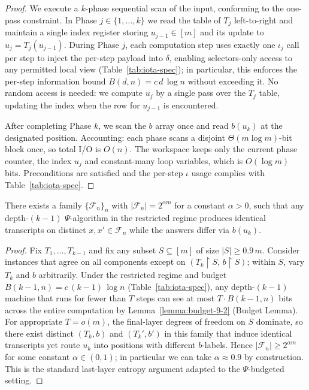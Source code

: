 \begin{proof}
We execute a $k$-phase sequential scan of the input, conforming to the one-pass constraint. In Phase $j\in\{1,\dots,k\}$ we read the table of $T_j$ left-to-right and maintain a single index register storing $u_{j-1}\in[m]$ and its update to $u_j=T_j(u_{j-1})$. During Phase $j$, each computation step uses exactly one $\iota_j$ call per step to inject the per-step payload into $\delta$, enabling selectors-only access to any permitted local view (Table~\ref{tab:iota-spec}); in particular, this enforces the per-step information bound $B(d,n)=c\,d\,\log n$ without exceeding it. No random access is needed: we compute $u_j$ by a single pass over the $T_j$ table, updating the index when the row for $u_{j-1}$ is encountered.

After completing Phase $k$, we scan the $b$ array once and read $b(u_k)$ at the designated position. Accounting: each phase scans a disjoint $\Theta(m\log m)$-bit block once, so total I/O is $O(n)$. The workspace keeps only the current phase counter, the index $u_j$ and constant-many loop variables, which is $O(\log m)$ bits. Preconditions are satisfied and the per-step $\iota$ usage complies with Table~\ref{tab:iota-spec}.
\end{proof}

\begin{lemma}
\label{Lk:lem:fooling-Lk}
There exists a family $\{\mathcal{F}_n\}_n$ with $\lvert\mathcal{F}_n\rvert = 2^{\alpha m}$ for a constant $\alpha>0$, such that any depth-$(k{-}1)$ $\Psi$-algorithm in the restricted regime produces identical transcripts on distinct $x,x'\in\mathcal{F}_n$ while the answers differ via $b(u_k)$.
\end{lemma}

\begin{proof}
Fix $T_1,\ldots,T_{k-1}$ and fix any subset $S\subseteq[m]$ of size $\lvert S\rvert \ge 0.9\,m$. Consider instances that agree on all components except on $(T_k\upharpoonright S,\, b\upharpoonright S)$; within $S$, vary $T_k$ and $b$ arbitrarily. Under the restricted regime and budget $B(k{-}1,n)=c\,(k{-}1)\,\log n$ (Table~\ref{tab:iota-spec}), any depth-$(k{-}1)$ machine that runs for fewer than $T$ steps can see at most $T\cdot B(k{-}1,n)$ bits across the entire computation by Lemma~\ref{lemma:budget-9-2} (Budget Lemma). For appropriate $T=o(m)$, the final-layer degrees of freedom on $S$ dominate, so there exist distinct $(T_k,b)$ and $(T_k',b')$ in this family that induce identical transcripts yet route $u_k$ into positions with different $b$-labels. Hence $\lvert\mathcal{F}_n\rvert \ge 2^{\alpha m}$ for some constant $\alpha\in(0,1)$; in particular we can take $\alpha\approx 0.9$ by construction. This is the standard last-layer entropy argument adapted to the $\Psi$-budgeted setting.
\end{proof}

